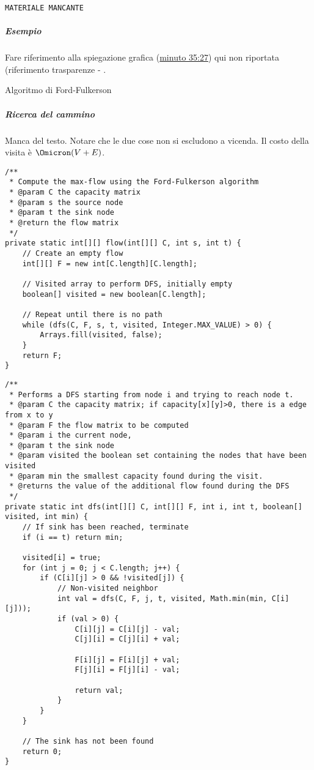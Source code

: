 \texttt{MATERIALE MANCANTE}

\subparagraph{Esempio}
Fare riferimento alla spiegazione grafica (\href{https://youtu.be/rxH0SEakE2Y?t=2127}{minuto 35:27}) qui non riportata (riferimento trasparenze  - .

\begin{algorithm}[H]
	\caption{Algoritmo di Ford-Fulkerson}
	
\end{algorithm}

\subparagraph{Ricerca del cammino}
Manca del testo.
Notare che le due cose non si escludono a vicenda.
Il costo della visita è \(\Omicron(V+E)\).

\begin{code}
\begin{verbatim}
/**
 * Compute the max-flow using the Ford-Fulkerson algorithm
 * @param C the capacity matrix
 * @param s the source node
 * @param t the sink node
 * @return the flow matrix
 */
private static int[][] flow(int[][] C, int s, int t) {
	// Create an empty flow
	int[][] F = new int[C.length][C.length];

	// Visited array to perform DFS, initially empty
	boolean[] visited = new boolean[C.length];

	// Repeat until there is no path
	while (dfs(C, F, s, t, visited, Integer.MAX_VALUE) > 0) {
		Arrays.fill(visited, false);
	}
	return F;
}
\end{verbatim}
\end{code}

\begin{code}
\begin{verbatim}
/**
 * Performs a DFS starting from node i and trying to reach node t.
 * @param C the capacity matrix; if capacity[x][y]>0, there is a edge from x to y
 * @param F the flow matrix to be computed
 * @param i the current node,
 * @param t the sink node
 * @param visited the boolean set containing the nodes that have been visited
 * @param min the smallest capacity found during the visit.
 * @returns the value of the additional flow found during the DFS
 */
private static int dfs(int[][] C, int[][] F, int i, int t, boolean[] visited, int min) {
	// If sink has been reached, terminate
	if (i == t) return min;

	visited[i] = true;
	for (int j = 0; j < C.length; j++) {
		if (C[i][j] > 0 && !visited[j]) {
			// Non-visited neighbor
			int val = dfs(C, F, j, t, visited, Math.min(min, C[i][j]));
			if (val > 0) {
				C[i][j] = C[i][j] - val;
				C[j][i] = C[j][i] + val;

				F[i][j] = F[i][j] + val;
				F[j][i] = F[j][i] - val;

				return val;
			}
		}
	}

	// The sink has not been found
	return 0;
}
\end{verbatim}
\end{code}

